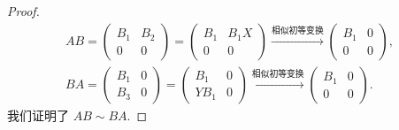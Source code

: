 \documentclass[../../main.tex]{subfiles}%
\begin{document}
\begin{proof}
\begin{gather*}
AB = \begin{pmatrix} B_1 & B_2 \\ 0 & 0 \end{pmatrix} = \begin{pmatrix} B_1 & B_1X \\ 0 & 0 \end{pmatrix} \xrightarrow{\hyperref[proposition:相似初等变换]{\text{相似初等变换}}} \begin{pmatrix} B_1 & 0 \\ 0 & 0 \end{pmatrix},
\\
BA = \begin{pmatrix} B_1 & 0 \\ B_3 & 0 \end{pmatrix} = \begin{pmatrix} B_1 & 0 \\ YB_1 & 0 \end{pmatrix} \xrightarrow{\hyperref[proposition:相似初等变换]{\text{相似初等变换}}} \begin{pmatrix} B_1 & 0 \\ 0 & 0 \end{pmatrix}.
\end{gather*}
我们证明了 \( AB \sim BA \).
\end{proof}
\end{document}
